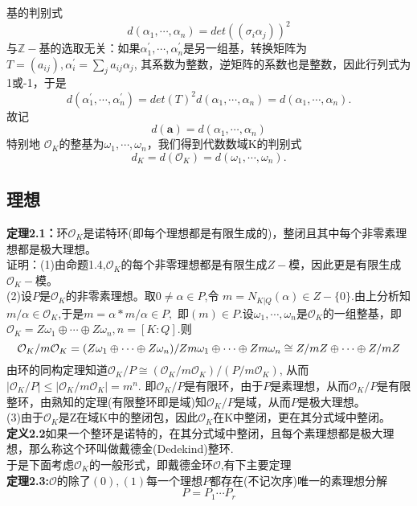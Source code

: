 \documentclass[UTF8]{article}
\begin{document}
    基的判别式$$d(\alpha_{1},\cdots,\alpha_{n})=det((\sigma_{i}\alpha_{j}))^2$$与$\mathbb{Z}-$基的选取无关：如果$\alpha_{1}^{'},\cdots,\alpha_{n}^{'}$是另一组基，转换矩阵为$T=(a_{ij}),\alpha_{i}^{'}=\sum_{j}a_{ij}\alpha_{j}$,
    其系数为整数，逆矩阵的系数也是整数，因此行列式为1或-1，于是$$
    d(\alpha_{1}^{'},\cdots,\alpha_{n}^{'})=det(T)^{2}d(\alpha_{1},\cdots,\alpha_{n})=d(\alpha_{1},\cdots,\alpha_{n}).
    $$
    故记$$d(\textbf{a})=d(\alpha_{1},\cdots,\alpha_{n})$$
    特别地
	$\mathcal{O}_{K}$的整基为$\omega_{1},\cdots ,\omega_{n}$，我们得到代数数域K的判别式$$d_{K}=d(\mathcal{O}_{K})=d(\omega_{1},\cdots ,\omega_{n}).$$
    \subsection{理想 }
    \textbf{定理2.1：}环$\mathcal{O}_{K}$是诺特环(即每个理想都是有限生成的)，整闭且其中每个非零素理想都是极大理想。\\
    证明：(1)由命题1.4,$\mathcal{O}_{K}$的每个非零理想都是有限生成$Z-$模，因此更是有限生成$\mathcal{O}_{K}-$模。\\
    (2)设$P$是$\mathcal{O}_{K}$的非零素理想。取$0\neq \alpha \in P$,令
    $m=N_{K|Q}(\alpha)\in Z-\{0\}.$由上分析知
    $m/\alpha \in \mathcal{O}_{K}$,于是$m=\alpha * m/\alpha \in P,$
    即$(m)\in P.$设$\omega_{1},\cdots ,\omega_{n}$是$\mathcal{O}_{K}$的一组整基，即$\mathcal{O}_{K}=Z\omega_{1}\oplus \cdots \oplus Z\omega_{n},n=[K:Q].$则$$
    \mathcal{O}_{K}/m\mathcal{O}_{K}=(Z\omega_{1}\oplus \cdots \oplus Z\omega_{n})/Zm\omega_{1}\oplus \cdots \oplus Zm\omega_{n}\\
    \cong Z/mZ\oplus \cdots \oplus Z/mZ
    $$
    由环的同构定理知道$\mathcal{O}_{K}/P\cong (\mathcal{O}_{K}/m\mathcal{O}_{K})/(P/m\mathcal{O}_{K})$,
    从而$|\mathcal{O}_{K}/P|\leq |\mathcal{O}_{K}/m\mathcal{O}_{K}|=m^{n}.$
    即$\mathcal{O}_{K}/P$是有限环，由于$P$是素理想，从而$\mathcal{O}_{K}/P$是有限整环，由熟知的定理(有限整环即是域)知$\mathcal{O}_{K}/P$是域，从而$P$是极大理想。\\
    (3)由于$\mathcal{O}_{K}$是Z在域K中的整闭包，因此$\mathcal{O}_{K}$在K中整闭，更在其分式域中整闭。\\
    \textbf{定义2.2}如果一个整环是诺特的，在其分式域中整闭，且每个素理想都是极大理想，那么称这个环叫做戴德金(Dedekind)整环.\\
    于是下面考虑$\mathcal{O}_{K}$的一般形式，即戴德金环$\mathcal{O}$,有下主要定理\\
    \textbf{定理2.3:}$\mathcal{O}$的除了$(0),(1)$每一个理想$P$都存在(不记次序)唯一的素理想分解$$
    P=P_{1}\cdots P_{r}
    $$
\end{document}
